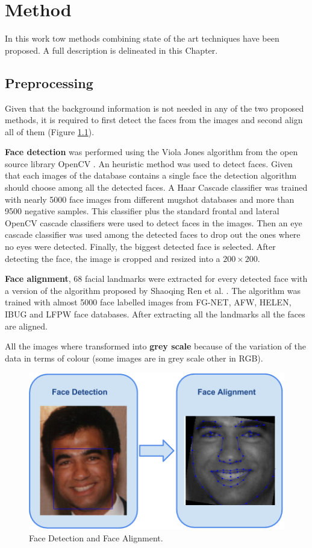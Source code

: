 \chapter{Method} \label{chap:method}
In this work tow methods combining state of the art techniques have been proposed. A full description is delineated in this Chapter.

\section{Preprocessing}\label{sec:preproces}

Given that the background information is not needed in any of the two proposed methods, it is required to first detect the faces from the images and second align all of them (Figure \ref{fig:preprocessing}).

\textbf{Face detection} was performed using the Viola Jones algorithm from the open source library OpenCV \cite{opencv_library}. An heuristic method was used to detect faces. Given that each images of the database contains a single face the detection algorithm should choose among all the detected faces. A Haar Cascade classifier was trained with nearly 5000 face images from different mugshot databases and more than 9500 negative samples. This classifier plus the standard frontal and lateral OpenCV cascade classifiers were used to detect faces in the images. Then an eye cascade classifier was used among the detected faces to drop out the ones where no eyes were detected. Finally, the biggest detected face is selected. After detecting the face, the image is cropped and resized into a $200 \times 200$.

\textbf{Face alignment}, 68 facial landmarks were extracted for every detected face with a version of the algorithm proposed by Shaoqing Ren et al. \cite{ren2014face}. The algorithm was trained with almost 5000 face labelled images from FG-NET, AFW, HELEN, IBUG and LFPW face databases. After extracting all the landmarks all the faces are aligned.

All the images where transformed into \textbf{grey scale} because of the variation of the data in terms of colour (some images are in grey scale other in RGB).

\begin{figure}[!h]
	\centering
	\includegraphics[width=\textwidth]{figures/preprocessing}
	\caption{Face Detection and Face Alignment.}
	\label{fig:preprocessing}
\end{figure}


